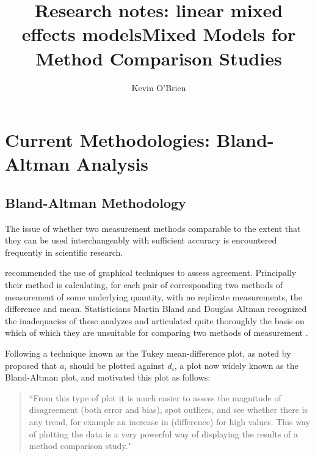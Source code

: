 \documentclass[12pt, a4paper]{report}
\title{Research notes: linear mixed effects models}
\author{ } \date{ }
\theoremstyle{plain}
\theoremstyle{definition}
\theoremstyle{remark}
\begin{document}
	\author{Kevin O'Brien}
	\title{Mixed Models for Method Comparison Studies}
	\tableofcontents
	
	\newpage
	\chapter{Current Methodologies: Bland-Altman Analysis}
	\section{Bland-Altman Methodology}
	
	
	The issue of whether two measurement methods comparable to the 	extent that they can be used interchangeably with sufficient accuracy is encountered frequently in scientific research.
	
	\citet{BA83} recommended the use of graphical techniques to assess agreement.
	Principally their method is calculating, for each pair of corresponding two methods of measurement of some underlying quantity, with no replicate measurements, the difference and mean. Statisticians Martin Bland and Douglas Altman recognized the inadequacies of these analyzes and articulated quite thoroughly the basis on which of which they are unsuitable for comparing two methods of measurement \citep*{BA83}. 
	
	Following a technique known as the Tukey mean-difference plot, as noted by \citet{kozak2014including}
	\citet{BA83} proposed that $a_i$ should be plotted against $d_i$, a plot now widely known as the Bland-Altman plot, and motivated this plot as follows:
	\begin{quote}
		``From this type of plot it is much easier to assess the magnitude
		of disagreement (both error and bias), spot outliers, and see
		whether there is any trend, for example an increase in (difference) for high values. This way of plotting the data is a very powerful way of displaying the results of a method comparison study."
	\end{quote}
	
\end{document}
